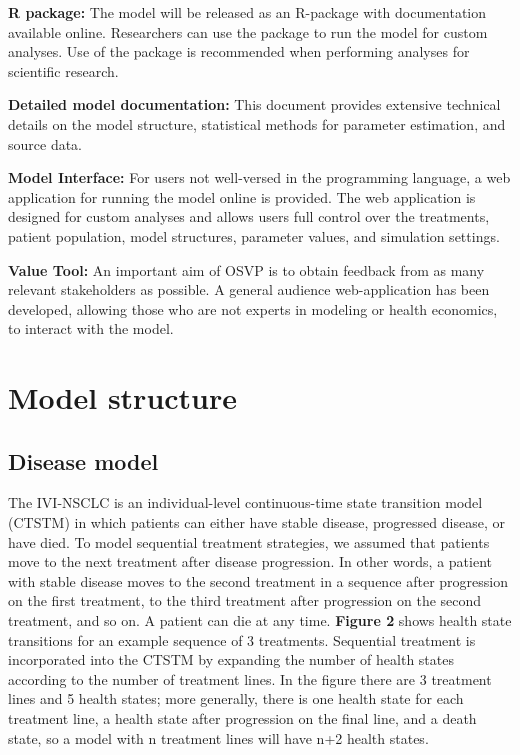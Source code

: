 \documentclass[11pt,final,fleqn]{article}\usepackage[]{graphicx}\usepackage[]{color}
\theoremstyle{plain}
\begin{document}
{\textbf{R package:} The model will be released as an R-package with documentation available online. Researchers can use the package to run the model for custom analyses. Use of the package is recommended when performing analyses for scientific research.

\textbf{Detailed model documentation:} This document provides extensive technical details on the model structure, statistical methods for parameter estimation, and source data.

\textbf{Model Interface:} For users not well-versed in the programming language, a web application for running the model online is provided. The web application is designed for custom analyses and allows users full control over the treatments, patient population, model structures, parameter values, and simulation settings.

\textbf{Value Tool:} An important aim of OSVP is to obtain feedback from as many relevant stakeholders as possible. A general audience web-application has been developed, allowing those who are not experts in modeling or health economics, to interact with the model.

\section{Model structure}\label{sec:model-structure}

\subsection{Disease model}

The IVI-NSCLC is an individual-level continuous-time state transition model (CTSTM) in which patients can either have stable disease, progressed disease, or have died. To model sequential treatment strategies, we assumed that patients move to the next treatment after disease progression. In other words, a patient with stable disease moves to the second treatment in a sequence after progression on the first treatment, to the third treatment after progression on the second treatment, and so on. A patient can die at any time. \textbf{Figure 2} shows health state transitions for an example sequence of 3 treatments. Sequential treatment is incorporated into the CTSTM by expanding the number of health states according to the number of treatment lines. In the figure there are 3 treatment lines and 5 health states; more generally, there is one health state for each treatment line, a health state after progression on the final line, and a death state, so a model with n treatment lines will have n+2 health states. 

}
\end{document}
